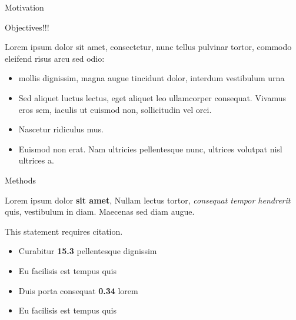\documentclass[final]{beamer}
\newlength{\onecolwid}
\begin{document}
\begin{frame}[t]
\begin{columns}[t]
\begin{column}{\onecolwid}
\begin{block}{Motivation {}}
    \end{block}



\begin{block}{Objectives!!!}

    Lorem  ipsum dolor sit amet, consectetur, nunc tellus pulvinar tortor, commodo eleifend risus arcu sed odio:
    \begin{itemize}
    \item mollis dignissim, magna augue tincidunt dolor, interdum vestibulum urna
    \item Sed aliquet luctus lectus, eget aliquet leo ullamcorper consequat. Vivamus eros sem, iaculis ut euismod non, sollicitudin vel orci.
    \item Nascetur ridiculus mus.  
    \item Euismod non erat. Nam ultricies pellentesque nunc, ultrices volutpat nisl ultrices a.
    \end{itemize}
    
    \end{block}


\begin{block}{Methods}

    Lorem ipsum dolor \textbf{sit amet}, Nullam lectus tortor, \textit{consequat tempor hendrerit} quis, vestibulum in diam. Maecenas sed diam augue.
    
    This statement requires citation.
    
    \end{block}
    
    
    \begin{itemize}
        \item Curabitur \textbf{15.3} pellentesque dignissim
        \item Eu facilisis est tempus quis
        \item Duis porta consequat \textbf{0.34} lorem
        \item Eu facilisis est tempus quis
        \end{itemize}


\end{column}
\end{columns}
\end{frame}
\end{document}
